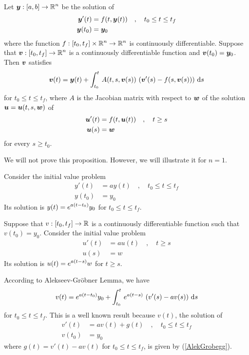 \begin{prop}
Let $\displaystyle \bm{y}:[a,b] \rightarrow \mathbb{R}^n$ be the solution of
\begin{align*}
\bm{y}'(t) &= f(t,\bm{y}(t)) \quad, \quad t_0 \leq t \leq t_f \\
\bm{y}(t_0) & = \bm{y}_0
\end{align*}
where the function $\displaystyle f:[t_0,t_f]\times \mathbb{R}^n \to \mathbb{R}^n$
is continuously differentiable.  Suppose that
$\displaystyle \bm{v}:[t_0,t_f]\rightarrow \mathbb{R}^n$ is
a continuously differentiable function and $\bm{v}(t_0) = \bm{y}_0$.
Then $\bm{v}$ satisfies
\[
\bm{v}(t) = \bm{y}(t) + \int_{t_0}^t\,A(t,s,\bm{v}(s))\,
\left( \bm{v}'(s) - f(s,\bm{v}(s)) \right) \,\mathrm{d}s
\]
for $t_0 \leq t \leq t_f$, where $A$ is the Jacobian matrix
with respect to $\bm{w}$ of the solution
$\bm{u} = \bm{u}(t,s,\bm{w})$ of
\begin{align*}
\bm{u}'(t) &= f(t,\bm{u}(t)) \quad , \quad t \geq s \\
\bm{u}(s) &= \bm{w}
\end{align*}
for every $s \geq t_0$.
\end{prop}

We will not prove this proposition.  However, we will illustrate it
for $n=1$.

\begin{egg}
Consider the initial value problem
\begin{align*}
y'(t) &= a y(t) \quad , \quad t_0 \leq t \leq t_f\\
y(t_0) &= y_0
\end{align*}
Its solution is $\displaystyle y(t) = e^{a(t-t_0)}y_0$ for $t_0 \leq t \leq t_f$.

Suppose that $v:[t_0,t_f]\rightarrow \mathbb{R}$ is a continuously
differentiable function such that $v(t_0) = y_0$.  Consider the
initial value problem
\begin{align*}
u'(t) &= a u(t) \quad , \quad t \geq s\\
u(s) &= w
\end{align*}
Its solution is $\displaystyle u(t) = e^{a(t-s)}w$ for $t \geq s$.

According to Alekseev-Gr\"{o}bner Lemma, we have
\begin{equation}\label{AlekGrobegg}
v(t) = e^{a(t-t_0)}y_0 + \int_{t_0}^t\,e^{a(t-s)}\,
\left(v'(s) - a v(s)\right) \,\mathrm{d}s
\end{equation}
for $t_0 \leq t \leq t_f$.  This is a well known result because $v(t)$,
the solution of
\begin{align*}
v'(t) & = a v(t) + g(t) \quad , \quad t_0 \leq t \leq t_f \\
v(t_0) &= y_0
\end{align*}
where $g(t) = v'(t) - av(t)$ for $t_0 \leq t \leq t_f$, is given by
(\ref{AlekGrobegg}).
\end{egg}

